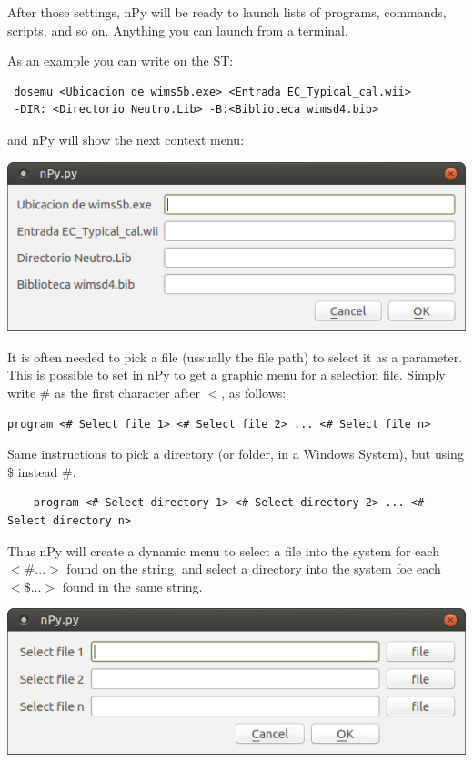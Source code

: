 \documentclass[a4paper,10pt]{article}
\begin{document}
\bigskip 

After those settings, nPy will be ready to launch lists of programs, commands, scripts, and so on. Anything you can launch from a terminal.

\bigskip 

\noindent As an example you can write on the ST:
\begin{verbatim}
 dosemu <Ubicacion de wims5b.exe> <Entrada EC_Typical_cal.wii> 
 -DIR: <Directorio Neutro.Lib> -B:<Biblioteca wimsd4.bib>
 \end{verbatim}
 
 \noindent and nPy will show the next context menu:
\begin{center}
 \includegraphics[width=\textwidth]{img/contextMenuString.png}
\end{center}

\bigskip 

It is often needed to pick a file (ussually the file path) to select it as a parameter. This is possible to set in nPy to get a graphic menu for a selection file. Simply write $\#$ as the first character after $<$, as follows: 

\begin{verbatim}
program <# Select file 1> <# Select file 2> ... <# Select file n>
 \end{verbatim}

Same instructions to pick a directory (or folder, in a Windows System), but using $\$$ instead $\#$.

 \begin{verbatim}
    program <# Select directory 1> <# Select directory 2> ... <# Select directory n>
\end{verbatim}

Thus nPy will create a dynamic menu to select a file into the system for each $<\# ...>$ found on the 
string, and select a directory into the system foe each $<\$ ...>$ found in the same string.

\begin{center}
 \includegraphics[width=\textwidth]{img/contextMenuExampleFile.png}
\end{center}
\end{document}
